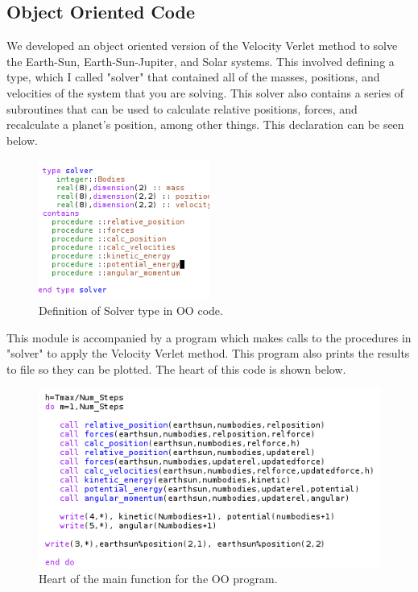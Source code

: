 \documentclass[%
oneside,                 %
final,                   %
10pt]{article}
\begin{document}
\subsection{Object Oriented Code}

We developed an object oriented version of the Velocity Verlet method to solve the Earth-Sun, Earth-Sun-Jupiter, and Solar systems.  This involved defining a type, which I called "solver" that contained all of the masses, positions, and velocities of the system that you are solving.  This solver also contains a series of subroutines that can be used to calculate relative positions, forces, and recalculate a planet's position, among other things.  This declaration can be seen below.

\begin{figure}[H]\label{fig:velrplot}
  \centering
    \includegraphics[width=0.5\textwidth]{solver.PNG}
    \caption{Definition of Solver type in OO code.}
\end{figure}

This module is accompanied by a program which makes calls to the procedures in "solver" to apply the Velocity Verlet method.  This program also prints the results to file so they can be plotted.  The heart of this code is shown below.

\begin{figure}[H]\label{fig:velrplot}
  \centering
    \includegraphics[width=1.0\textwidth]{twobody.PNG}
    \caption{Heart of the main function for the OO program.}
\end{figure}
\end{document}
